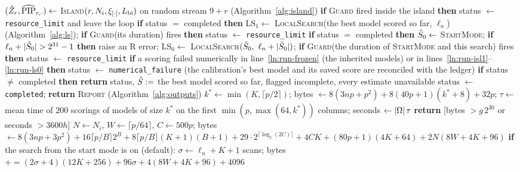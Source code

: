 \begin{algorithm}
{\begin{algorithmic}[1]
\label{ln:run-isl1}
\State $(\hat Z_r,\widehat{\mathrm{PIP}}_{r,\cdot})\gets$ \textsc{Island}$(r,N_i,\xi_{[\cdot]},L_{\mathrm{bi}})$ on random stream $9+r$ (Algorithm~\ref{alg:island}) %
\State \textbf{if} \textsc{Guard} fired inside the island \textbf{then} status $\gets$ \texttt{resource\_limit} and leave the loop %
\EndFor
\State\label{ln:run-ls1} \textbf{if} status $=$ completed \textbf{then} $\mathrm{LS}_1\gets$ \textsc{LocalSearch}(the best model scored so far, $\ell_n$) (Algorithm~\ref{alg:ls}); \textbf{if} \textsc{Guard}(its duration) fires \textbf{then} status $\gets$ \texttt{resource\_limit} %
\State\label{ln:run-ls0} \textbf{if} status $=$ completed \textbf{then} $\tilde S_0\gets$ \textsc{StartMode}; \textbf{if} $\ell_n+\lvert \tilde S_0\rvert>2^{31}-1$ \textbf{then} raise an R error; $\mathrm{LS}_0\gets$ \textsc{LocalSearch}$(\tilde S_0,\ \ell_n+\lvert \tilde S_0\rvert)$; \textbf{if} \textsc{Guard}(the duration of \textsc{StartMode} and this search) fires \textbf{then} status $\gets$ \texttt{resource\_limit} %
\State \textbf{if} a scoring failed numerically in line~\ref{ln:run-frozen} (the inherited models) or in lines~\ref{ln:run-isl1}--\ref{ln:run-ls0} \textbf{then} status $\gets$ \texttt{numerical\_failure} (the calibration's best model and its saved score are reconciled with the ledger) %
\State \textbf{if} status $\ne$ completed \textbf{then return} status, $\hat S:=$ the best model scored so far, flagged incomplete, every estimate unavailable %
\State status $\gets$ \texttt{completed}; \textbf{return} \textsc{Report} (Algorithm~\ref{alg:outputs}) %
\EndProcedure
{}
\State $k^*\gets\min(K,\lceil p/2\rceil)$; bytes $\gets8(3np+p^2)+8(40p+1)(k^*+8)+32p$; $\tau\gets$ mean time of $200$ scorings of models of size $k^*$ on the first $\min(p,\max(64,k^*))$ columns; seconds $\gets\lvert \Omega\rvert\,\tau$ %
\State \textbf{return} [bytes $>g\,2^{30}$ or seconds $>3600h$] %
\Else
\State $N\gets N_i$, $W\gets\lceil p/64\rceil$, $C\gets500p$; bytes $\gets8(3np+3p^2)+16\lceil p/B\rceil2^B+8\lceil p/B\rceil(K+1)(B+1)+29\cdot2^{\lceil\log_2(2C)\rceil}+4CK+(80p+1)(4K+64)+2N(8W+4K+96)$ %
\State \textbf{if} the search from the start mode is on (default): $\sigma\gets\ell_n+K+1$ scans; bytes $\mathrel{+}=(2\sigma+4)(12K+256)+96\sigma+4(8W+4K+96)+4096$ %

\end{algorithmic}}
\end{algorithm}
